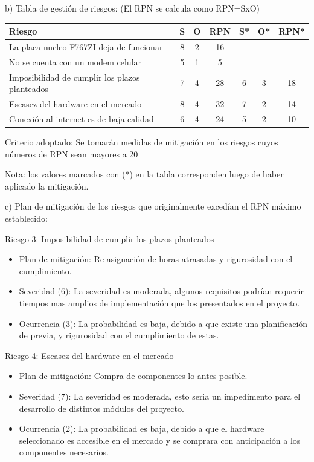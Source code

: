 \documentclass[
11pt, %
]{charter}
\begin{document}
b) Tabla de gestión de riesgos:      (El RPN se calcula como RPN=SxO)

\begin{table}[htpb]
\centering
\begin{tabularx}{\linewidth}{@{}|X|c|c|c|c|c|c|@{}}
\hline
\rowcolor[HTML]{C0C0C0} 
Riesgo & S & O & RPN & S* & O* & RPN* \\ \hline
La placa nucleo-F767ZI deja de funcionar       &  8 &  2 &  16   &    &    &      \\ \hline
No se cuenta con un modem celular       & 5  & 1  &  5   &    &    &      \\ \hline
Imposibilidad de cumplir los plazos planteados       &  7 & 4  &  28   &  6  & 3    &   18   \\ \hline
Escasez del hardware en el mercado       &  8 & 4  &  32  &  7  & 2   &  14    \\ \hline
Conexión al internet es de baja calidad       & 6  & 4  &  24   &  5  &  2  &     10 \\ \hline
\end{tabularx}%
\end{table}

Criterio adoptado: 
Se tomarán medidas de mitigación en los riesgos cuyos números de RPN sean mayores a 20

Nota: los valores marcados con (*) en la tabla corresponden luego de haber aplicado la mitigación.

c) Plan de mitigación de los riesgos que originalmente excedían el RPN máximo establecido:
 
Riesgo 3: Imposibilidad de cumplir los plazos planteados
\begin{itemize}
	\item Plan de mitigación: Re asignación de horas atrasadas y rigurosidad con el cumplimiento.
	\item Severidad (6): La severidad es moderada, algunos requisitos podrían requerir tiempos mas amplios de implementación que los presentados en el proyecto.
	\item Ocurrencia (3): La probabilidad es baja, debido a que existe una planificación de previa, y rigurosidad con el cumplimiento de estas.
\end{itemize}

Riesgo 4: Escasez del hardware en el mercado
\begin{itemize}
	\item Plan de mitigación: Compra de componentes lo antes posible.
	\item Severidad (7): La severidad es moderada, esto seria un impedimento para el desarrollo de distintos módulos del proyecto.
	\item Ocurrencia (2): La probabilidad es baja, debido a que el hardware seleccionado es accesible en el mercado y se comprara con anticipación a los componentes necesarios.
\end{itemize}
\end{document}
